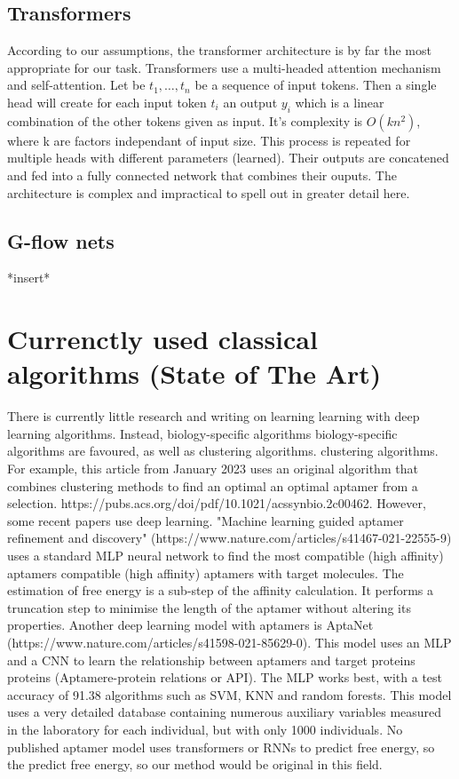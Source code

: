 \documentclass{article}
\begin{document}
\subsection*{Transformers}
According to our assumptions, the transformer 
architecture \cite{transformers} is by far the most appropriate
for our task. Transformers use a multi-headed 
attention mechanism and self-attention. Let
be $t_1, \dots, t_n$ be a sequence of input tokens. Then a single 
head will create for each input token $t_i$ an output $y_i$ which is a 
linear combination of the other tokens given as input. It's complexity
is $O(kn^2)$, where k are factors independant of input size. This process is 
repeated for multiple heads with different parameters (learned). Their
outputs are concatened and fed into a fully connected network that combines 
their ouputs. The architecture is complex and impractical to spell out
in greater detail here.

\subsection*{G-flow nets}
*insert*

\section*{Currenctly used classical algorithms (State of The Art)}
There is currently little research and writing on learning 
learning with deep learning algorithms. Instead, biology-specific algorithms 
biology-specific algorithms are favoured, as well as clustering algorithms. 
clustering algorithms. For example, this article from January 2023 uses 
an original algorithm that combines clustering methods to find an optimal 
an optimal aptamer from a selection. 
https://pubs.acs.org/doi/pdf/10.1021/acssynbio.2c00462.
However, some recent papers use deep learning. 
"Machine learning guided aptamer refinement 
and discovery" (https://www.nature.com/articles/s41467-021-22555-9) 
uses a standard MLP neural network to find the most compatible (high affinity) aptamers 
compatible (high affinity) aptamers with target molecules. The estimation of 
free energy is a sub-step of the affinity calculation. It performs a 
truncation step to minimise the length of the aptamer without altering its properties. 
Another deep learning model with aptamers is AptaNet 
(https://www.nature.com/articles/s41598-021-85629-0). This model uses an 
MLP and a CNN to learn the relationship between aptamers and target proteins 
proteins (Aptamere-protein relations or API). The MLP works best, with a 
test accuracy of 91.38%
algorithms such as SVM, KNN and random forests. This model 
uses a very detailed database containing numerous auxiliary variables 
measured in the laboratory for each individual, but with only 1000 individuals. 
No published aptamer model uses transformers or RNNs to predict free energy, so the 
predict free energy, so our method would be original in this field.


\end{document}

